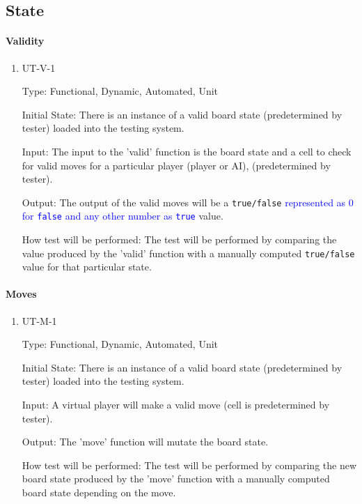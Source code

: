 \documentclass[12pt, titlepage]{article}
\begin{document}
\subsection{State}

\paragraph{Validity}

\begin{enumerate}

	\item UT-V-1

	      Type: Functional, Dynamic, Automated, Unit

	      Initial State: There is an instance of a valid board state (predetermined by tester) loaded into the testing system.

	      Input: The input to the 'valid' function is the board state and a cell to check for valid moves for a particular player (player or AI), (predetermined by tester).

	      Output: The output of the valid moves will be a \texttt{true/false} \textcolor{blue}{represented as 0 for \texttt{false} and any other number as \texttt{true}} value.

	      How test will be performed: The test will be performed by comparing the value produced by the 'valid' function with a manually computed \texttt{true/false} value for that particular state.

\end{enumerate}

\paragraph{Moves}

\begin{enumerate}

	\item UT-M-1

	      Type: Functional, Dynamic, Automated, Unit

	      Initial State: There is an instance of a valid board state (predetermined by tester) loaded into the testing system.

	      Input: A virtual player will make a valid move (cell is predetermined by tester).

	      Output: The 'move' function will mutate the board state.

	      How test will be performed: The test will be performed by comparing the new board state produced by the 'move' function with a manually computed board state depending on the move.

\end{enumerate}
\end{document}
